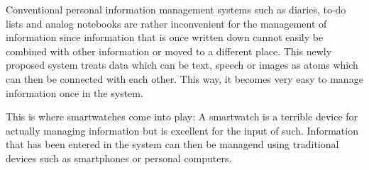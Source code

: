 \noindent Conventional personal information management systems such as diaries, to-do lists and analog notebooks are rather inconvenient for the management of information since information that is once written down cannot easily be combined with other information or moved to a different place. This newly proposed system treats data which can be text, speech or images as atoms which can then be connected with each other. This way, it becomes very easy to manage information once in the system.

This is where smartwatches come into play: A smartwatch is a terrible device for actually managing information but is excellent for the input of such. Information that has been entered in the system can then be managend using traditional devices such as smartphones or personal computers.
